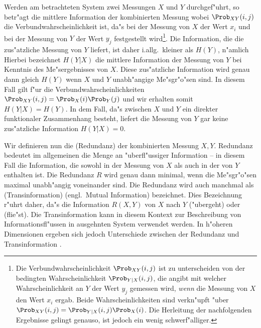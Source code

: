 Werden am betrachteten System zwei Messungen $X$ und $Y$ durchgef"uhrt, so betr"agt die
mittlere Information der kombinierten Messung 
wobei $\Prob_{XY}(i,j)$ die Verbundwahrscheinlichkeit ist, da"s bei der
Messung von $X$ der Wert $x_i$ und bei der Messung von $Y$ der Wert $y_j$ festgestellt
wird\footnote{Die Verbundwahrscheinlichkeit $\Prob_{XY}(i,j)$ ist zu unterscheiden von der
  bedingten Wahrscheinlichkeit $\Prob_{Y|X}(i,j)$, die angibt mit welcher
  Wahrscheinlichkeit an $Y$ der Wert $y_j$ gemessen wird, \emph{wenn} die Messung von $X$
  den Wert $x_i$ ergab. Beide Wahrscheinlichkeiten sind verkn"upft "uber
  $\Prob_{XY}(i,j)=\Prob_{Y|X}(i,j)\Prob_X(i)$. Die Herleitung der nachfolgenden
  Ergebnisse gelingt genauso, ist jedoch ein wenig schwerf"alliger.}.  Die Information,
die die zus"atzliche Messung von $Y$ liefert, ist daher i.allg.\ kleiner als $H(Y)$,
n"amlich 
Hierbei bezeichnet $H(Y|X)$ die mittlere Information der
Messung von $Y$ bei Kenntnis des Me"sergebnisses von $X$. Diese zus"atzliche Information
wird genau dann gleich $H(Y)$ wenn $X$ und $Y$ unabh"angige Me"sgr"o"sen sind. In diesem
Fall gilt f"ur die Verbundwahrscheinlichkeiten $\Prob_{XY}(i,j)=\Prob_X(i)\Prob_Y(j)$ und
wir erhalten
 somit $H(Y|X)=H(Y)$. In dem Fall, da"s zwischen $X$ und $Y$ ein direkter
funktionaler Zusammenhang besteht, liefert die Messung von $Y$ gar keine zus"atzliche
Information $H(Y|X)=0$.

Wir definieren nun die \begriff(Redundanz) der kombinierten Messung $X,Y$. Redundanz
bedeutet im allgemeinen die Menge an "uberfl"ussiger Information -- in diesem Fall die
Information, die sowohl in der Messung von $X$ als auch in der von $Y$ enthalten ist.
 Die Redundanz $R$ wird genau dann minimal,
wenn die Me"sgr"o"sen maximal unabh"angig voneinander sind. Die Redundanz wird auch
manchmal als \begriff(Transinformation) (engl.\ Mutual Information) bezeichnet. Dies
Bezeichnung r"uhrt daher, da"s die Information $R(X,Y)$ von $X$ nach $Y$ \slang("ubergeht)
oder \slang(flie"st). Die Transinformation kann in diesem Kontext zur Beschreibung von
Informationsfl"ussen in ausgehnten System verwendet werden\cite{Pawelzik91}.  In h"oheren
Dimensionen ergeben sich jedoch Unterschiede zwischen der Redundanz und Transinformation
\cite{Prichard95}.



